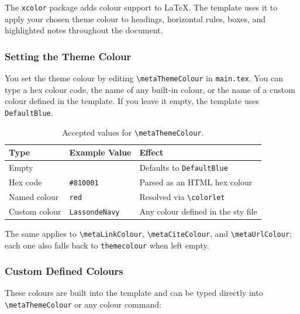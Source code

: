 The \texttt{xcolor} package adds colour support to \LaTeX. The template uses it to apply your chosen theme colour to headings, horizontal rules, boxes, and highlighted notes throughout the document.

\subsubsection{Setting the Theme Colour}
You set the theme colour by editing \texttt{\textbackslash metaThemeColour} in \texttt{main.tex}. You can type a hex colour code, the name of any built-in colour, or the name of a custom colour defined in the template. If you leave it empty, the template uses \texttt{DefaultBlue}.

\begin{table}[H]
	\centering
	\caption{Accepted values for \texttt{\textbackslash metaThemeColour}.}
	\label{tab:theme-colour-values}
	\begin{tabularx}{\linewidth}{@{}llX@{}}
		\toprule
		Type & Example Value & Effect \\
		\midrule
		Empty         & \texttt{}        & Defaults to \texttt{DefaultBlue} \\
		Hex code      & \texttt{\#810001}  & Parsed as an HTML hex colour \\
		Named colour  & \texttt{red}     & Resolved via \texttt{\textbackslash colorlet} \\
		Custom colour & \texttt{LassondeNavy} & Any colour defined in the sty file \\
		\bottomrule
	\end{tabularx}
\end{table}

The same applies to \texttt{\textbackslash metaLinkColour}, \texttt{\textbackslash metaCiteColour}, and \texttt{\textbackslash metaUrlColour}; each one also falls back to \texttt{themecolour} when left empty.

\subsubsection{Custom Defined Colours}
These colours are built into the template and can be typed directly into \texttt{\textbackslash metaThemeColour} or any colour command:

